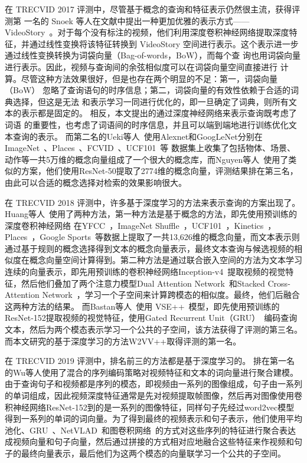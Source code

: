 在 TRECVID 2017 评测中，尽管基于概念的查询和特征表示仍然很主流，获得评测第
一名的 Snoek 等人在文献\cite{snoek2017university}中提出一种更加优雅的表示方式——VideoStory~\cite{habibian2014videostory}。对于每个没有标注的视频，他们利用深度卷积神经网络提取深度特征，并通过线性变换将该特征转换到
VideoStory 空间进行表示。这个表示进一步通过线性变换转换为词袋向量（Bag-of-words，BoW），而每个查
询也用词袋向量进行表示。因此，视频与查询间的余弦相似度可以在词袋向量空间直接进行
计算。尽管这种方法效果很好，但是也存在两个明显的不足：第一，词袋向量（BoW）
忽略了查询语句的时序信息；第二，词袋向量的有效性依赖于合适的词典选择，但这是无法
和表示学习一同进行优化的，即一旦确定了词典，则所有文本的表示都是固定的。
相反，本文提出的通过深度神经网络来表示查询既考虑了词语
的重要性，也考虑了词语间的时序信息，并且可以端到端地进行训练优化文本查询的表示。
而第二名的Ueki等人~\cite{ueki2017waseda}使用Alexnet和GoogLeNet分别在ImageNet~\cite{deng2009imagenet}、Places~\cite{zhou2014learning}、FCVID~\cite{jiang2017exploiting}、UCF101~\cite{soomro2012ucf101}等
数据集上收集了包括物体、场景、动作等一共5万维的概念向量组成了一个很大的概念库，而Nguyen等人~\cite{nguyen2017vireo}使用了类似的方案，他们使用ResNet-50提取了2774维的概念向量，评测结果排在第三名，由此可以合适的概念选择对检索的效果影响很大。

在 TRECVID 2018 评测中，许多基于深度学习的方法来表示查询的方案出现了。
Huang等人~\cite{huang2018informedia}使用了两种方法，第一种方法是基于概念的方法，即先使用预训练的深度卷积神经网络
在YFCC~\cite{thomee2016yfcc100m}，ImageNet Shuffle~\cite{mettes2016the}，UCF101~\cite{soomro2012ucf101}，Kinetics~\cite{carreira2017quo}，Places~\cite{zhou2014learning}，Google Sports~\cite{karpathy2014large}等数据上提取了一共13,626维的概念向量，而文本表示则通过基于规则的概念选择得到文本的概念向量表示，最终文本查询与候选视频的相似度在概念向量空间计算得到。第二种方法是通过联合嵌入空间的方法为文本学习连续的向量表示，即先用预训练的卷积神经网络Inception-v4~\cite{szegedy2016inception}提取视频的视觉特征，然后他们叠加了两个注意力模型Dual Attention Network~\cite{nam2017dual}和Stacked Cross-Attention Network~\cite{lee2018stacked}，学习一个子空间来计算跨模态的相似度。最终，他们后融合这两种方法的结果。
而Bastan等人~\cite{bastan2018ntu}使用 VSE++~\cite{faghri2017vse++}模型，即先使用预训练的ResNet-152提取视频的视觉特征，使用Gated Recurrent Unit（GRU）~\cite{cho2014learning}编码查询文本，然后为两个模态表示学习一个公共的子空间，该方法获得了评测的第三名。而本文研究的基于深度学习的方法W2VV++取得评测的第一名。

在 TRECVID 2019 评测中，排名前三的方法都是基于深度学习的。
排在第一名的Wu等人\cite{wu2019hybrid}使用了混合的序列编码策略对视频特征和文本的词向量进行聚合建模。由于查询句子和视频都是序列的模态，即视频由一系列的图像组成，句子由一系列的单词组成，因此视频深度特征通常是先对视频提取帧图像，然后再对图像使用卷积神经网络ResNet-152到的是一系列的图像特征，同样句子先经过word2vec模型得到一系列的单词的词向量。为了得到最终的视频表示和句子表示，他们使用平均池化、GRU~\cite{cho2014learning}、NetVLAD~\cite{arandjelovic2016netvlad}和图卷积网络~\cite{mao2018hierarchical}的方式对这些序列的特征进行聚合表达成视频向量和句子向量，然后通过拼接的方式相对应地融合这些特征来作视频和句子的最终向量表示，最后他们为这两个模态的向量联学习一个公共的子空间。

